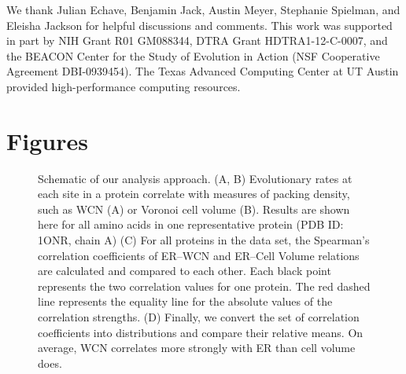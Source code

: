 \documentclass[12pt]{article}
\begin{document}
We thank Julian Echave, Benjamin Jack, Austin Meyer, Stephanie Spielman, and Eleisha Jackson for helpful discussions and comments. This work was supported in part by NIH Grant R01 GM088344, DTRA Grant HDTRA1-12-C-0007, and the BEACON Center for the Study of Evolution in Action (NSF Cooperative Agreement DBI-0939454). The Texas Advanced Computing Center at UT Austin provided high-performance computing resources.





\cleardoublepage
\section*{Figures}

    \begin{figure}[h]
        \caption{Schematic of our analysis approach. (A, B) Evolutionary rates at each site in a protein correlate with measures of packing density, such as WCN (A) or Voronoi cell volume (B). Results are shown here for all amino acids in one representative protein (PDB ID: 1ONR, chain A) (C) For all proteins in the data set, the Spearman's correlation coefficients of ER--WCN and ER--Cell Volume relations are calculated and compared to each other. Each black point represents the two correlation values for one protein. The red dashed line represents the equality line for the absolute values of the correlation strengths. (D) Finally, we convert the set of correlation coefficients into distributions and compare their relative means. On average, WCN correlates more strongly with ER than cell volume does.}
        \label{fig:pipeline}
    \end{figure}
\end{document}

